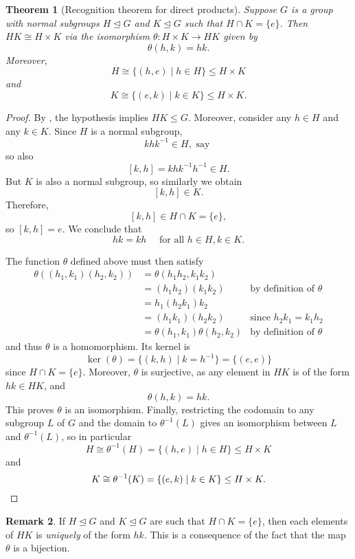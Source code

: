 \documentclass[12pt]{report}
\newtheorem{theorem}{Theorem}[chapter]
\numberwithin{equation}{section}
\numberwithin{theorem}{chapter}
\theoremstyle{definition}
\newtheorem*{basic properties}{Basic Properties}
\newtheorem*{Important Remark}{Important Remark}
\newtheorem{remark}[theorem]{Remark}
\renewcommand{\ker}{\operatorname{ker}}
\begin{document}
\begin{theorem}[Recognition theorem for direct products]\label{direct product recognition}
Suppose $G$ is a group with normal subgroups $H \trianglelefteq G$ and $K \trianglelefteq G$ such that $H\cap K=\{e\}$. Then $HK\cong H\times K$ via the isomorphism $\theta\!: H \times K \to HK$ given by
$$\theta(h,k) = hk.$$ 
Moreover, 
$$H \cong \{(h,e)\mid h\in H\}\leq H\times K$$
and 
$$K\cong \{(e,k)\mid k\in K\}\leq H\times K.$$
\end{theorem}

\begin{proof}
By , the hypothesis implies $HK \leq G$. Moreover, consider any $h \in H$ and any $k \in K$. Since $H$ is a normal subgroup,
$$khk^{-1} \in H, \textrm{ say }$$
so also 
$$[k,h]=khk^{-1}h^{-1}\in H.$$ 
But $K$ is also a normal subgroup, so similarly we obtain
$$[k,h]\in K.$$
Therefore,
$$[k,h] \in H \cap K = \{ e \},$$
so $[k,h]= e$. We conclude that 
$$hk = kh \quad \textrm{ for all } h\in H, k\in K.$$

The function $\theta$ defined above must then satisfy
$$\begin{aligned}
\theta((h_1, k_1) (h_2, k_2))  & = 
\theta(h_1h_2, k_1k_2) \\
& = (h_1h_2)(k_1k_2) & \textrm{by definition of } \theta \\
& = h_1(h_2k_1)k_2\\
& = (h_1k_1)(h_2k_2) & \textrm{since } h_2k_1 = k_1h_2\\
& = \theta(h_1, k_1) \theta(h_2, k_2) & \textrm{by definition of } \theta
\end{aligned}$$
and thus $\theta$ is a homomorphism. Its kernel is 
$$\ker(\theta) = \{(k,h) \mid k = h^{-1} \} = \{ (e,e) \}$$
since $H \cap K = \{e\}$. Moreover, $\theta$ is surjective, as any element in $HK$ is of the form $hk \in HK$, and
$$\theta(h,k) = hk.$$ 
This proves $\theta$ is an isomorphism. Finally, restricting the codomain to any subgroup $L$ of $G$ and the domain to $\theta^{-1}(L)$ gives an isomorphism between $L$ and $\theta^{-1}(L)$, so in particular
$$H \cong \theta^{-1}(H)=\{(h,e)\mid h\in H\}\leq H\times K$$
and 
$$K\cong \theta^{-1}(K)=\{(e,k)\mid k\in K\}\leq H\times K.\qedhere$$
\end{proof}


\begin{remark} 
If $H\trianglelefteq G$ and $K\trianglelefteq G$ are such that $H\cap K=\{e\}$, then each elements of $HK$ is {\em uniquely} of the form $hk$. This is a consequence of the fact that the map $\theta$ is a bijection.	
\end{remark}
\end{document}
